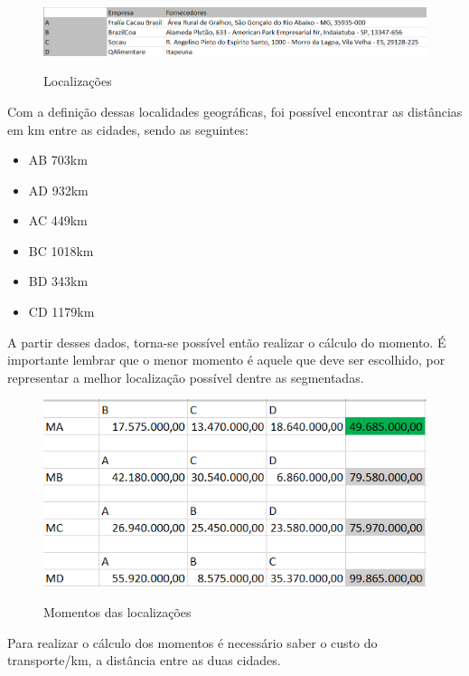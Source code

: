 \documentclass[
	12pt,				%
	openright,			%
	oneside,			%
	a4paper,			%
	english,			%
	french,				%
	spanish,			%
	brazil				%
	]{abntex2}
\begin{document}
\begin{figure}[H]
\begin{center}
\caption{Localizações}
\includegraphics[scale=0.5]{../../Pictures/tabela1.png} 
\label{loca}
\end{center}
\end{figure}

Com a definição dessas localidades geográficas, foi possível encontrar as distâncias em km entre as cidades, sendo as seguintes:

\begin{itemize}
\item AB 703km  
\item AD 932km
\item AC 449km
\item BC 1018km
\item BD 343km
\item CD 1179km
\end{itemize}

A partir desses dados, torna-se possível então realizar o cálculo do momento. É importante lembrar que o menor momento é aquele que deve ser escolhido, por representar a melhor localização possível dentre as segmentadas.

\begin{figure}[H]
\begin{center}
\caption{Momentos das localizações}
\includegraphics[scale=0.6]{../../Pictures/tabela3.png} 
\label{loca}
\end{center}
\end{figure}

Para realizar o cálculo dos momentos é necessário saber o custo do transporte/km, a distância entre as duas cidades.
	
\end{document}
